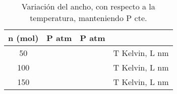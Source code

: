 \documentclass[]{article}
\begin{document}
\begin{table}
\centering
\begin{tabular}{|c|c|c|l|} \hline
    n (mol) & P atm & P atm &       \\ \hline
    50      &       &       & T Kelvin, L nm \\ \hline
    100     &       &       & T Kelvin, L nm \\ \hline
    150     &       &       & T Kelvin, L nm \\ \hline

\end{tabular}
\caption{\label{tab:V.Ancho} Variación del ancho, con respecto a la temperatura, manteniendo P cte.}    
\end{table}



















































\end{document}
